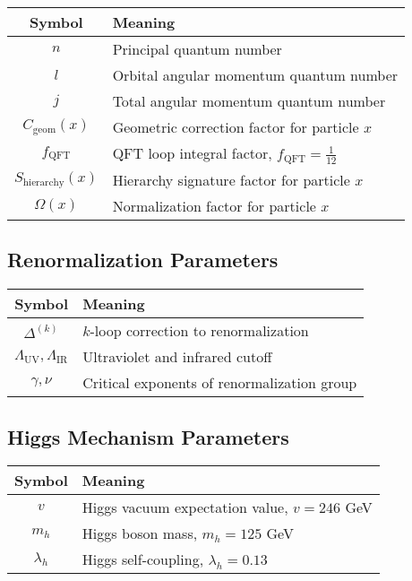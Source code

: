 \documentclass[12pt,a4paper]{article}
\numberwithin{equation}{section}
\newcommand{\Cgeom}{C_{\text{geom}}}
\newcommand{\fQFT}{f_{\text{QFT}}}
\newcommand{\Omegafactor}{\Omega}
\begin{document}
	\begin{longtable}{cl}
		\toprule
		\textbf{Symbol} & \textbf{Meaning} \\
		\midrule
		$n$ & Principal quantum number \\
		$l$ & Orbital angular momentum quantum number \\
		$j$ & Total angular momentum quantum number \\
		$\Cgeom(x)$ & Geometric correction factor for particle $x$ \\
		$\fQFT$ & QFT loop integral factor, $\fQFT = \frac{1}{12}$ \\
		$S_{\text{hierarchy}}(x)$ & Hierarchy signature factor for particle $x$ \\
		$\Omegafactor(x)$ & Normalization factor for particle $x$ \\
		\bottomrule
	\end{longtable}
	
	\subsection{Renormalization Parameters}
	
	\begin{longtable}{cl}
		\toprule
		\textbf{Symbol} & \textbf{Meaning} \\
		\midrule
		$\Delta^{(k)}$ & $k$-loop correction to renormalization \\
		$\Lambda_{\text{UV}}, \Lambda_{\text{IR}}$ & Ultraviolet and infrared cutoff \\
		$\gamma, \nu$ & Critical exponents of renormalization group \\
		\bottomrule
	\end{longtable}
	
	\subsection{Higgs Mechanism Parameters}
	
	\begin{longtable}{cl}
		\toprule
		\textbf{Symbol} & \textbf{Meaning} \\
		\midrule
		$v$ & Higgs vacuum expectation value, $v = 246$ GeV \\
		$m_h$ & Higgs boson mass, $m_h = 125$ GeV \\
		$\lambda_h$ & Higgs self-coupling, $\lambda_h = 0.13$ \\
		\bottomrule
	\end{longtable}
	
\end{document}

